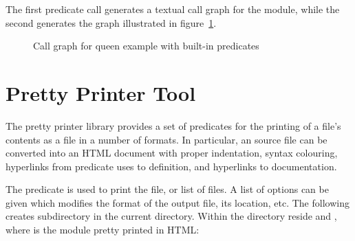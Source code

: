 The first  predicate call generates a textual call graph
for the  module, while the second generates the
 graph illustrated in figure~\ref{xrefdavinci}.

\begin{figure}[hbt]
\begin{center}
\end{center}
\caption{Call graph for queen example with built-in predicates}
\label{xrefdavinci}
\end{figure}

\section{Pretty Printer Tool}

The pretty printer library provides a set of predicates for the printing
of a file's contents as a file in a number of formats.
In particular, an {\eclipse} source file can be converted into an
HTML document with proper indentation, syntax colouring, hyperlinks
from predicate uses to definition, and hyperlinks to documentation.

The 
predicate is used to print the file, or list of files.
A list of options can be given which modifies the format of the output
file, its location, etc.  The following creates subdirectory 
in the current directory. Within the  directory reside
 and , where  is
the  module pretty printed in HTML:

